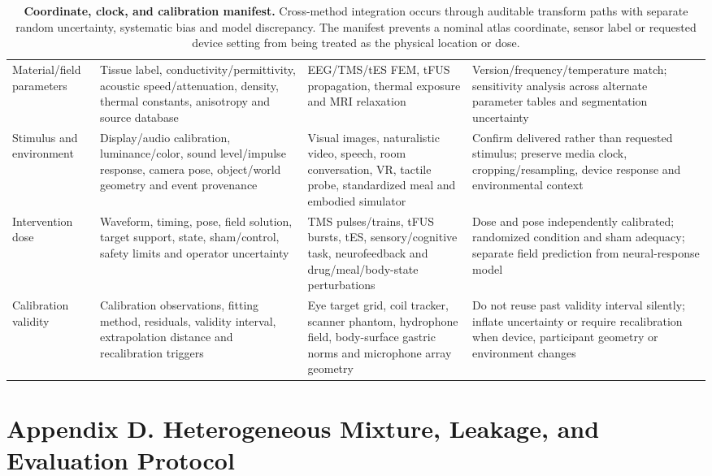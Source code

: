 \begin{table}[!h]
\begin{tabularx}{\textwidth}{@{}p{}p{}p{}X@{}}
Material/field parameters &
Tissue label, conductivity/permittivity, acoustic speed/attenuation, density,
thermal constants, anisotropy and source database &
EEG/TMS/tES FEM, tFUS propagation, thermal exposure and MRI relaxation &
Version/frequency/temperature match; sensitivity analysis across alternate
parameter tables and segmentation uncertainty\\

Stimulus and environment &
Display/audio calibration, luminance/color, sound level/impulse response,
camera pose, object/world geometry and event provenance &
Visual images, naturalistic video, speech, room conversation, VR, tactile
probe, standardized meal and embodied simulator &
Confirm delivered rather than requested stimulus; preserve media clock,
cropping/resampling, device response and environmental context\\

Intervention dose &
Waveform, timing, pose, field solution, target support, state, sham/control,
safety limits and operator uncertainty &
TMS pulses/trains, tFUS bursts, tES, sensory/cognitive task, neurofeedback and
drug/meal/body-state perturbations &
Dose and pose independently calibrated; randomized condition and sham
adequacy; separate field prediction from neural-response model\\

Calibration validity &
Calibration observations, fitting method, residuals, validity interval,
extrapolation distance and recalibration triggers &
Eye target grid, coil tracker, scanner phantom, hydrophone field,
body-surface gastric norms and microphone array geometry &
Do not reuse past validity interval silently; inflate uncertainty or require
recalibration when device, participant geometry or environment changes\\
\bottomrule
\end{tabularx}
\caption{\textbf{Coordinate, clock, and calibration manifest.} Cross-method
integration occurs through auditable transform paths with separate random
uncertainty, systematic bias and model discrepancy. The manifest prevents a
nominal atlas coordinate, sensor label or requested device setting from being
treated as the physical location or dose.}
\label{tab:calibration-manifest}
\end{table}

\clearpage
\section{Appendix D. Heterogeneous Mixture, Leakage, and Evaluation Protocol}

